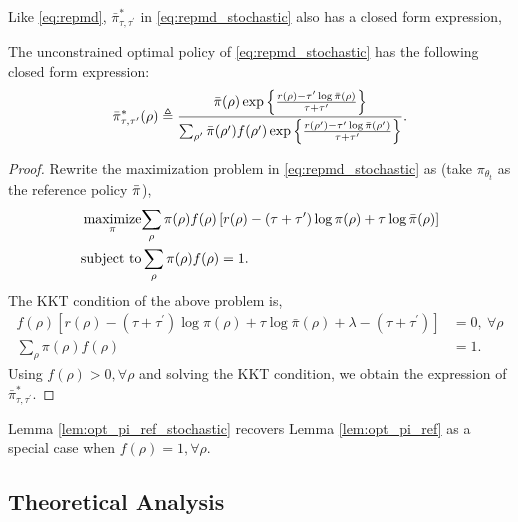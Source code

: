 Like \cref{eq:repmd}, $\bar{\pi}_{\tau,\tau^{\prime}}^*$ in \cref{eq:repmd_stochastic} also has a closed form expression,
\begin{lem}
\label{lem:opt_pi_ref_stochastic}
The unconstrained optimal policy of \cref{eq:repmd_stochastic} has the following closed form expression:
\begin{equation*}
	\bar{\pi}_{\tau,\tau^{\prime}}^*(\rho) \triangleq \frac{\bar{\pi}(\rho) \exp\left\{ \frac{r(\rho)-\tau^{\prime} \log \bar{\pi}(\rho) }{ \tau+\tau^{\prime}} \right\}}{ \sum_{\rho^{\prime}}{\bar{\pi}(\rho^{\prime}) f(\rho^{\prime}) \exp\left\{ \frac{r(\rho^{\prime})-\tau^{\prime} \log \bar{\pi}(\rho^{\prime})}{ \tau+\tau^{\prime}} \right\} } }.
\end{equation*}
\end{lem}
\begin{proof}
Rewrite the maximization problem in \cref{eq:repmd_stochastic} as (take $\pi_{\theta_t}$ as the reference policy $\bar{\pi}$),
\begin{equation*}
\begin{split}
	\operatorname*{\text{maximize}}\limits_{\pi}&{ \sum\limits_{\rho}{ \pi(\rho) f(\rho) \left[ r(\rho)  - \left( \tau + \tau^{\prime} \right) \log{\pi(\rho)} + \tau \log{\bar{\pi}(\rho)} \right]} } \\
	\text{subject to} &\sum\limits_{\rho}{ \pi(\rho) f(\rho)} = 1.
\end{split}
\end{equation*}
The KKT condition of the above problem is,
\begin{equation*}
\begin{split}
	f(\rho) \left[ r(\rho) - \left( \tau + \tau^{\prime} \right) \log{\pi(\rho)} + \tau \log{\bar{\pi}(\rho)} +  \lambda - \left( \tau + \tau^{\prime} \right) \right] &= 0, \ \forall \rho \\
	\sum\limits_{\rho}{ \pi(\rho) f(\rho)} &= 1.
\end{split}
\end{equation*}
Using $f(\rho) > 0, \forall \rho$ and solving the KKT condition, we obtain the expression of $\bar{\pi}_{\tau,\tau^{\prime}}^*$.
\end{proof}

Lemma \ref{lem:opt_pi_ref_stochastic} recovers Lemma \ref{lem:opt_pi_ref} as a special case when $f(\rho) = 1, \forall \rho$.

\subsection{Theoretical Analysis}

